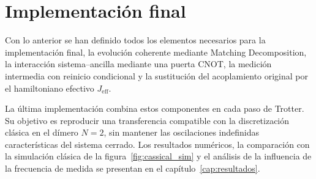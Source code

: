 \section{Implementación final}

Con lo anterior se han definido todos los elementos necesarios para la implementación final, la evolución coherente mediante Matching Decomposition, la interacción sistema--ancilla mediante una puerta CNOT, la medición intermedia con reinicio condicional y la sustitución del acoplamiento original por el hamiltoniano efectivo $J_{\mathrm{eff}}$.

La última implementación combina estos componentes en cada paso de Trotter. Su objetivo es reproducir una transferencia compatible con la discretización clásica en el dímero $N=2$, sin mantener las oscilaciones indefinidas características del sistema cerrado. Los resultados numéricos, la comparación con la simulación clásica de la figura~\ref{fig:cassical_sim} y el análisis de la influencia de la frecuencia de medida se presentan en el capítulo~\ref{cap:resultados}.

